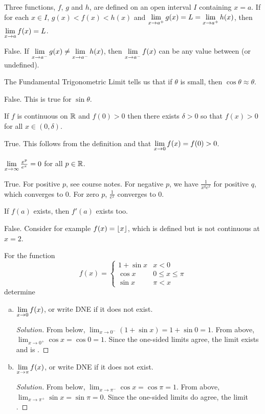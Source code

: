\documentclass{agony}
\begin{document}
\setcounter{paragraph}{5}

\question Three functions, $f$, $g$ and $h$, are defined on an open interval $I$ containing $x=a$.
If for each $x \in I$, $g(x)< f(x)< h(x)$ and $\lim\limits_{x\to a^+} g(x) = L = \lim\limits_{x\to a^+} h(x)$, then $\lim\limits_{x\to a} f(x) = L$.

False. If $\lim\limits_{x\to a^-} g(x) \neq \lim\limits_{x\to a^-} h(x)$, then $\lim\limits_{x\to a^-} f(x)$ can be any value between (or undefined).

\question The Fundamental Trigonometric Limit tells us that if $\theta$ is small, then $\cos\theta \approx \theta$.

False. This is true for $\sin\theta$.

\question If $f$ is continuous on $\mathbb{R}$ and $f(0) > 0$ then there exists $\delta > 0$ so that $f(x) > 0$ for all $x\in(0,\delta)$.

True. This follows from the \epsdel{} definition and that $\lim\limits_{x\to0}f(x)=f(0)>0$.

\question $\lim\limits_{x\to\infty} \frac{x^p}{e^x}=0$ for all $p \in \mathbb{R}$.

True. For positive $p$, see course notes.
For negative $p$, we have $\frac{1}{x^q e^x}$ for positive $q$, which converges to 0.
For zero $p$, $\frac{1}{e^x}$ converges to 0.

\question If $f(a)$ exists, then $f'(a)$ exists too.

False. Consider for example $f(x)=\lfloor x\rfloor$, which is defined but is not continuous at $x=2$.



\question For the function \begin{equation*}
  f(x) = \begin{cases}
    1+\sin x & x < 0             \\
    \cos x   & 0 \leq x \leq \pi \\
    \sin x   & \pi < x
  \end{cases}
\end{equation*} determine
\begin{enumerate}[(a)]
  \item $\lim\limits_{x\to0}f(x)$, or write DNE if it does not exist.
        \begin{proof}[Solution]
          From below, $\lim_{x\to0^-}(1+\sin x)=1+\sin0=1$.
          From above, $\lim_{x\to0^+}\cos x=\cos 0=1$.
          Since the one-sided limits agree, the limit exists and is .
        \end{proof}
  \item $\lim\limits_{x\to\pi}f(x)$, or write DNE if it does not exist.
        \begin{proof}[Solution]
          From below, $\lim_{x\to\pi^-}\cos x=\cos \pi=1$.
          From above, $\lim_{x\to\pi^+}\sin x=\sin \pi=0$.
          Since the one-sided limits do agree, the limit .
        \end{proof}
\end{enumerate}
\end{document}
